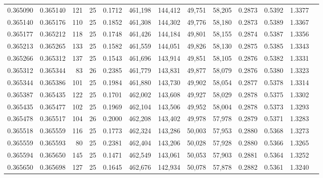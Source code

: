 \begin{tabular}{rrrrrrrrrrrrr}
0.365090 & 0.365140 &   121 &  25 &                                     0.1712 & 461,198 & 144,412 &  49,751 &  58,205 & 0.2873 & 0.5392 & 1.3377 \\
0.365140 & 0.365176 &   110 &  25 &                                     0.1852 & 461,308 & 144,302 &  49,776 &  58,180 & 0.2873 & 0.5389 & 1.3367 \\
0.365177 & 0.365212 &   118 &  25 &                                     0.1748 & 461,426 & 144,184 &  49,801 &  58,155 & 0.2874 & 0.5387 & 1.3356 \\
0.365213 & 0.365265 &   133 &  25 &                                     0.1582 & 461,559 & 144,051 &  49,826 &  58,130 & 0.2875 & 0.5385 & 1.3343 \\
0.365266 & 0.365312 &   137 &  25 &                                     0.1543 & 461,696 & 143,914 &  49,851 &  58,105 & 0.2876 & 0.5382 & 1.3331 \\
0.365312 & 0.365344 &    83 &  26 &                                     0.2385 & 461,779 & 143,831 &  49,877 &  58,079 & 0.2876 & 0.5380 & 1.3323 \\
0.365344 & 0.365386 &   101 &  25 &                                     0.1984 & 461,880 & 143,730 &  49,902 &  58,054 & 0.2877 & 0.5378 & 1.3314 \\
0.365387 & 0.365435 &   122 &  25 &                                     0.1701 & 462,002 & 143,608 &  49,927 &  58,029 & 0.2878 & 0.5375 & 1.3302 \\
0.365435 & 0.365477 &   102 &  25 &                                     0.1969 & 462,104 & 143,506 &  49,952 &  58,004 & 0.2878 & 0.5373 & 1.3293 \\
0.365478 & 0.365517 &   104 &  26 &                                     0.2000 & 462,208 & 143,402 &  49,978 &  57,978 & 0.2879 & 0.5371 & 1.3283 \\
0.365518 & 0.365559 &   116 &  25 &                                     0.1773 & 462,324 & 143,286 &  50,003 &  57,953 & 0.2880 & 0.5368 & 1.3273 \\
0.365559 & 0.365593 &    80 &  25 &                                     0.2381 & 462,404 & 143,206 &  50,028 &  57,928 & 0.2880 & 0.5366 & 1.3265 \\
0.365594 & 0.365650 &   145 &  25 &                                     0.1471 & 462,549 & 143,061 &  50,053 &  57,903 & 0.2881 & 0.5364 & 1.3252 \\
0.365650 & 0.365698 &   127 &  25 &                                     0.1645 & 462,676 & 142,934 &  50,078 &  57,878 & 0.2882 & 0.5361 & 1.3240 \\

\end{tabular}
